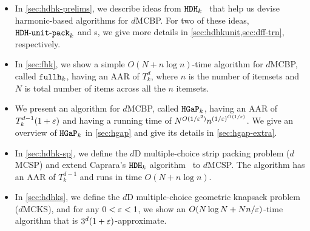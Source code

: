 \begin{itemize}
\item In \cref{sec:hdhk-prelims}, we describe ideas from $\operatorname{\mathtt{HDH}}_{k}$~\cite{caprara2008}
    that help us devise harmonic-based algorithms for $d$MCBP.
    For two of these ideas, $\operatorname{\mathtt{HDH-unit-pack}}_k$ and \dff{}s,
    we give more details in \cref{sec:hdhkunit,sec:dff-trn}, respectively.
\item In \cref{sec:fhk}, we show a simple $O(N + n\log n)$-time algorithm for $d$MCBP,
    called $\operatorname{\mathtt{fullh}}_k$, having an AAR of $T_k^d$, where $n$ is the number of itemsets
    and $N$ is total number of items across all the $n$ itemsets.
\item We present an algorithm for $d$MCBP, called $\operatorname{\mathtt{HGaP}}_k$, having an AAR of
    $T_k^{d-1}(1+\varepsilon)$ and having a running time of $N^{O(1/\varepsilon^2)}n^{(1/\varepsilon)^{O(1/\varepsilon)}}$.
    We give an overview of $\operatorname{\mathtt{HGaP}}_k$ in \cref{sec:hgap}
    and give its details in \cref{sec:hgap-extra}.
\item In \cref{sec:hdhk-sp}, we define the $d$D multiple-choice strip packing problem ($d$MCSP)
    and extend Caprara's $\operatorname{\mathtt{HDH}}_{k}$ algorithm~\cite{caprara2008} to $d$MCSP.
    The algorithm has an AAR of $T_k^{d-1}$ and runs in time $O(N + n\log n)$.
\item In \cref{sec:hdhks}, we define the $d$D multiple-choice geometric knapsack problem ($d$MCKS),
    and for any $0 < \varepsilon < 1$, we show an $O(N\log N + Nn/\varepsilon)$-time algorithm
    that is $3^d(1+\varepsilon)$-approximate.
\end{itemize}
